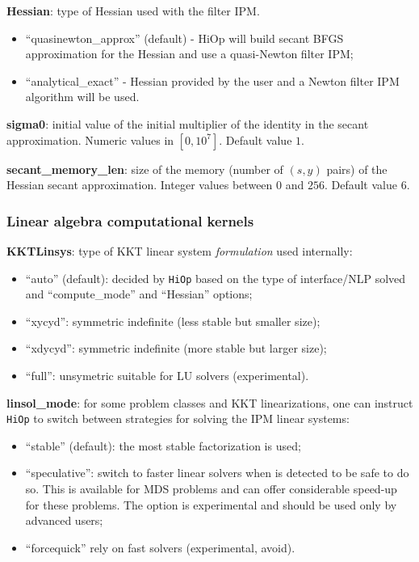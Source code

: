 \documentclass[11pt]{article}
\newcounter{line}
\newcommand{\Hi}{\texttt{HiOp}\xspace}
\begin{document}
\medskip

\noindent \textbf{Hessian}: type of Hessian used with the filter IPM.
\begin{itemize}
\item ``quasinewton\_approx'' (default) - HiOp will build secant BFGS approximation for the Hessian and use a quasi-Newton filter IPM;
\item ``analytical\_exact'' - Hessian provided by the user and a Newton filter IPM algorithm will be used.
\end{itemize}

\medskip

\noindent \textbf{sigma0}: initial value of the initial multiplier of the identity in the secant approximation. Numeric values in $[0,10^7]$. Default value $1$.

\medskip

\noindent \textbf{secant\_memory\_len}: size of the memory (number of $(s,y)$ pairs) of the Hessian secant approximation. Integer values between $0$ and $256$. Default value $6$.

\subsubsection{Linear algebra computational kernels}

\noindent \textbf{KKTLinsys}: type of KKT linear system \textit{formulation} used internally:
\begin{itemize}
\item ``auto'' (default): decided by \Hi based on the type of interface/NLP solved and ``compute\_mode'' and ``Hessian'' options;
\item ``xycyd'': symmetric indefinite (less stable but smaller size);
\item ``xdycyd'': symmetric indefinite (more stable but  larger size);
\item  ``full'': unsymetric suitable for LU solvers (experimental).
\end{itemize}

\medskip

\noindent \textbf{linsol\_mode}: for some problem classes and KKT linearizations, one can instruct \Hi to switch between strategies for solving the IPM linear systems:
\begin{itemize}
\item ``stable'' (default): the most stable factorization is used;
\item ``speculative'': switch to faster linear solvers when is detected to be safe to do so. This is available for MDS problems and can offer considerable speed-up for these problems. The option is experimental and should be used only by advanced users;
\item ``forcequick'' rely on fast solvers (experimental, avoid).
\end{itemize}
\end{document}
